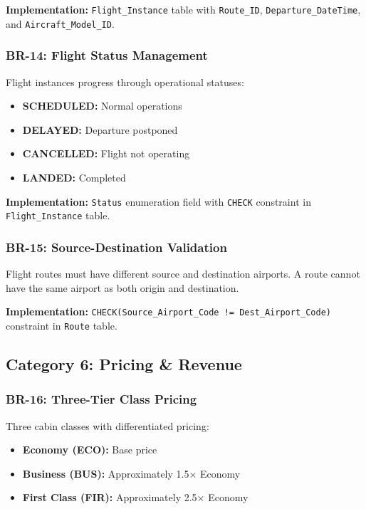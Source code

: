 \documentclass[12pt,a4paper,openany]{report}
\begin{document}
\textbf{Implementation:} \texttt{Flight\_Instance} table with \texttt{Route\_ID}, \texttt{Departure\_DateTime}, and \texttt{Aircraft\_Model\_ID}.

\subsubsection{BR-14: Flight Status Management}
Flight instances progress through operational statuses:
\begin{itemize}
    \item \textbf{SCHEDULED:} Normal operations
    \item \textbf{DELAYED:} Departure postponed
    \item \textbf{CANCELLED:} Flight not operating
    \item \textbf{LANDED:} Completed
\end{itemize}

\textbf{Implementation:} \texttt{Status} enumeration field with \texttt{CHECK} constraint in \texttt{Flight\_Instance} table.

\subsubsection{BR-15: Source-Destination Validation}
Flight routes must have different source and destination airports. A route cannot have the same airport as both origin and destination.

\textbf{Implementation:} \texttt{CHECK(Source\_Airport\_Code != Dest\_Airport\_Code)} constraint in \texttt{Route} table.

\subsection{Category 6: Pricing \& Revenue}

\subsubsection{BR-16: Three-Tier Class Pricing}
Three cabin classes with differentiated pricing:
\begin{itemize}
    \item \textbf{Economy (ECO):} Base price
    \item \textbf{Business (BUS):} Approximately 1.5× Economy
    \item \textbf{First Class (FIR):} Approximately 2.5× Economy
\end{itemize}
\end{document}
